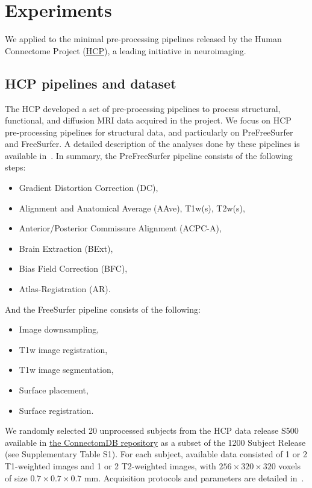 \section{Experiments}

We applied \toolname to the minimal
pre-processing pipelines released by the Human Connectome Project
(\href{https://www.humanconnectome.org}{HCP}), a leading initiative in
neuroimaging.

\subsection{HCP pipelines and dataset}

The HCP developed a set of pre-processing pipelines to process structural,
functional, and diffusion MRI data acquired in the project. We focus on HCP
pre-processing pipelines for structural data, and particularly
on PreFreeSurfer and FreeSurfer.
A detailed description of the analyses done by these
pipelines is available in~\cite{glasser2013}.
In summary, the PreFreeSurfer pipeline consists of the following steps:
\begin{itemize}
\item Gradient Distortion Correction (DC),
\item Alignment and Anatomical Average (AAve), T1w(s), T2w(s),
\item Anterior/Posterior Commissure Alignment (ACPC-A),
\item Brain Extraction (BExt),
\item Bias Field Correction (BFC),
\item Atlas-Registration (AR).
\end{itemize}
And the FreeSurfer pipeline consists of the following:
\begin{itemize}
\item Image downsampling,
\item T1w image registration,
\item T1w image segmentation,
\item Surface placement,
\item Surface registration.
\end{itemize}

We randomly selected 20 unprocessed subjects from the HCP data release S500
available in \href{https://db.humanconnectome.org}{the ConnectomDB
repository} as a subset of the 1200 Subject Release (see Supplementary Table S1).
For each subject, available data consisted of 1 or 2 T1-weighted images and 1 or 2
T2-weighted images, with $256 \times 320 \times 320$ voxels of size $0.7
\times 0.7 \times 0.7$ mm. Acquisition protocols and parameters are
detailed in~\cite{van2013wu}.

